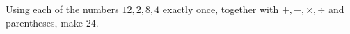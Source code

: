 Using each of the numbers $12,2,8,4$ exactly once, together with $+,-,\times,\div$ and parentheses, make $24$.
